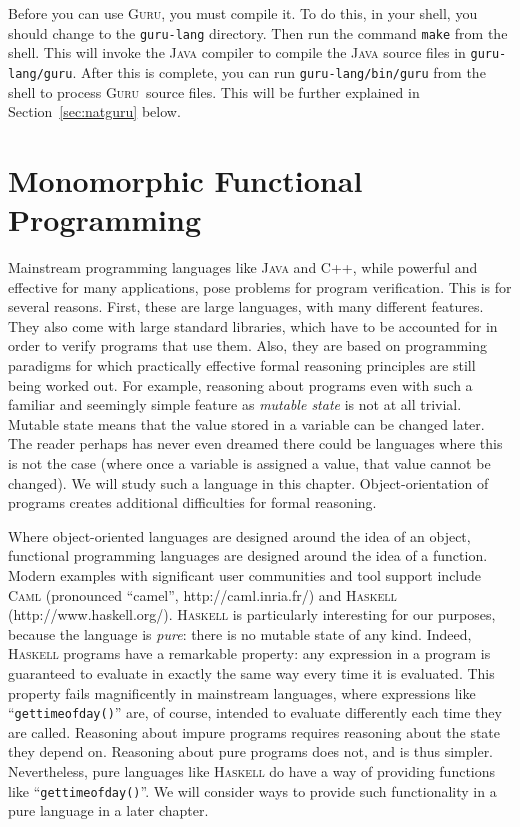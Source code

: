 \documentclass{book}[12pt]
\newcommand{\guru}[0]{\textsc{Guru}}
\begin{document}
Before you can use \guru, you must compile it.  To do this, in your
shell, you should change to the \texttt{guru-lang} directory.  Then
run the command \texttt{make} from the shell.  This will invoke the
\textsc{Java} compiler to compile the \textsc{Java} source files in
\texttt{guru-lang/guru}.  After this is complete, you can run
\texttt{guru-lang/bin/guru} from the shell to process \guru\ source
files.  This will be further explained in Section~\ref{sec:natguru}
below.

\chapter{Monomorphic Functional Programming}

Mainstream programming languages like \textsc{Java} and \textsc{C++},
while powerful and effective for many applications, pose problems for
program verification.  This is for several reasons.  First, these are
large languages, with many different features.  They also come with
large standard libraries, which have to be accounted for in order to
verify programs that use them.  Also, they are based on programming
paradigms for which practically effective formal reasoning principles
are still being worked out.  For example, reasoning about programs
even with such a familiar and seemingly simple feature as
\emph{mutable state} is not at all trivial.  Mutable state means that
the value stored in a variable can be changed later.  The reader
perhaps has never even dreamed there could be languages where this is
not the case (where once a variable is assigned a value, that value
cannot be changed).  We will study such a language in this chapter.
Object-orientation of programs creates additional difficulties for
formal reasoning.

Where object-oriented languages are designed around the idea of an
object, functional programming languages are designed around the idea
of a function.  Modern examples with significant user communities and
tool support include \textsc{Caml} (pronounced ``camel'',
http://caml.inria.fr/) and \textsc{Haskell} (http://www.haskell.org/).
\textsc{Haskell} is particularly interesting for our purposes, because
the language is \emph{pure}: there is no mutable state of any kind.
Indeed, \textsc{Haskell} programs have a remarkable property: any
expression in a program is guaranteed to evaluate in exactly the same
way every time it is evaluated.  This property fails magnificently in
mainstream languages, where expressions like
``\texttt{gettimeofday()}'' are, of course, intended to evaluate
differently each time they are called.  Reasoning about impure
programs requires reasoning about the state they depend on.  Reasoning
about pure programs does not, and is thus simpler.  Nevertheless, pure
languages like \textsc{Haskell} do have a way of providing functions
like ``\texttt{gettimeofday()}''.  We will consider ways to provide
such functionality in a pure language in a later chapter.
\end{document}
